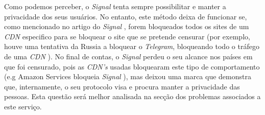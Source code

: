 Como podemos perceber, o \textit{Signal} tenta sempre possibilitar e manter a privacidade dos seus usuários. No entanto, este método deixa de funcionar se, como mencionado no artigo do \textit{Signal} \cite{signalDomainFronting}, forem bloqueados todos os sites de um \textit{CDN} especifico para se bloquear o site que se pretende censurar (por exemplo, houve uma tentativa da Russia a bloquear o \textit{Telegram}, bloqueando todo o tráfego de uma \textit{CDN} \cite{domainFrontingExplained, domainFrontingBlock}). No final de contas, o \textit{Signal} perdeu o seu alcance nos países em que foi censurado, pois as \textit{CDN's} usadas bloquearam este tipo de comportamento (e.g Amazon Services bloqueia \textit{Signal} \cite{signalDomainFronting}), mas deixou uma marca que demonstra que, internamente, o seu protocolo visa e procura manter a privacidade das pessoas. Esta questão será melhor analisada na secção dos problemas associados a este serviço.
